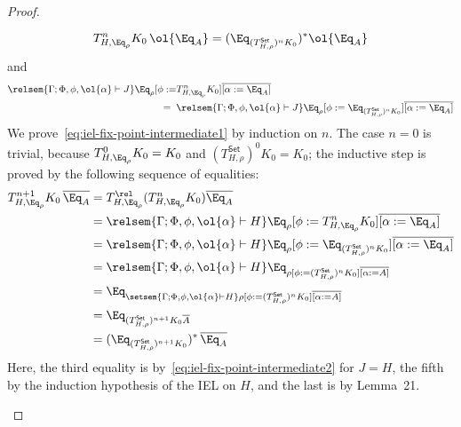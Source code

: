 \documentclass[acmsmall,review,anonymous]{acmart}
\theoremstyle{definition}
\newcommand{\set}{\mathsf{Set}}
\begin{document}
\begin{proof}
\begin{itemize}
\begin{equation}\label{eq:iel-fix-point-intermediate1}
T^n_{H, \Eq_{\rho}} K_0\, \ol{\Eq_A} = (\Eq_{(T^\set_{H, \rho})^n K_0})^*
\ol{\Eq_A}
\end{equation}
and 
\begin{equation}\label{eq:iel-fix-point-intermediate2}
\begin{split}
  \relsem{\Gamma; \Phi, \phi, \ol{\alpha} \vdash J}
\Eq_{\rho} [\phi := 
 & T^{n}_{H,\Eq_{\rho}} K_0] \overline{[\alpha :=
    \Eq_A]} \\
=\;\; & \relsem{\Gamma; \Phi, \phi, \ol{\alpha} \vdash J} \Eq_{\rho} [\phi
  := \Eq_{(T^\set_{H,\rho})^n K_0}] \overline{[\alpha :=
    \Eq_A]}
\end{split}
\end{equation}
We prove~\eqref{eq:iel-fix-point-intermediate1} by induction on $n$.
The case $n=0$ is trivial, because $T^0_{H,\Eq_{\rho}} K_0 = K_0$ and
$(T^\set_{H,\rho})^0 K_0 = K_0$; the inductive step is proved by the
following sequence of equalities:
\[
\begin{split}
T^{n+1}_{H,\Eq_{\rho}} K_0\, \overline{\Eq_A}
&= T^\rel_{H,\Eq_{\rho}} (T^{n}_{H,\Eq_{\rho}} K_0)
\overline{\Eq_A} \\ 
&= \relsem{\Gamma; \Phi, \phi, \ol{\alpha} \vdash H} \Eq_{\rho} [\phi
  := T^{n}_{H, \Eq_{\rho}} K_0] \overline{[\alpha :=
    \Eq_A]} \\ 
&= \relsem{\Gamma; \Phi, \phi, \ol{\alpha} \vdash H} \Eq_{\rho} [\phi
  := \Eq_{(T^\set_{H,\rho})^n K_0}] \overline{[\alpha :=
    \Eq_A]} \\ 
&= \relsem{\Gamma; \Phi, \phi, \ol{\alpha} \vdash H} \Eq_{\rho [\phi
    := (T^\set_{H,\rho})^n K_0] \overline{[\alpha :=
      A]}} \\ 
&= \Eq_{\setsem{\Gamma; \Phi, \phi, \ol{\alpha} \vdash H} \rho [\phi
    := (T^\set_{H,\rho})^n K_0] \overline{[\alpha :=
      A]}} \\ 
&= \Eq_{(T^\set_{H,\rho})^{n+1} K_0 \overline{A}} \\ 
&= (\Eq_{(T^\set_{H,\rho})^{n+1} K_0})^*\, \overline{\Eq_A} 
\end{split}
\]
Here, the third equality is by~\eqref{eq:iel-fix-point-intermediate2}
for $J = H$, the fifth by the induction hypothesis of the IEL on $H$,
and the last is by Lemma~21.

\vspace*{0.1in}


\end{itemize}
\end{proof}
\end{document}
